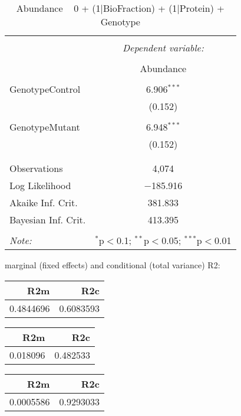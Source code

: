 \documentclass[11pt]{report}
\begin{document}
\begin{table}[!htbp] \centering 
  \caption{Abundance ~ 0 + (1|BioFraction) + (1|Protein) + Genotype} 
  \label{} 
\begin{tabular}{@{\extracolsep{5pt}}lc} 
\\[-1.8ex]\hline 
\hline \\[-1.8ex] 
 & \multicolumn{1}{c}{\textit{Dependent variable:}} \\ 
\cline{2-2} 
\\[-1.8ex] & Abundance \\ 
\hline \\[-1.8ex] 
 GenotypeControl & 6.906$^{***}$ \\ 
  & (0.152) \\ 
  & \\ 
 GenotypeMutant & 6.948$^{***}$ \\ 
  & (0.152) \\ 
  & \\ 
\hline \\[-1.8ex] 
Observations & 4,074 \\ 
Log Likelihood & $-$185.916 \\ 
Akaike Inf. Crit. & 381.833 \\ 
Bayesian Inf. Crit. & 413.395 \\ 
\hline 
\hline \\[-1.8ex] 
\textit{Note:}  & \multicolumn{1}{r}{$^{*}$p$<$0.1; $^{**}$p$<$0.05; $^{***}$p$<$0.01} \\ 
\end{tabular} 
\end{table} 
marginal (fixed effects) and conditional (total variance) R2:

\begin{tabular}{r|r}
\hline
R2m & R2c\\
\hline
0.4844696 & 0.6083593\\
\hline
\end{tabular}

\begin{tabular}{r|r}
\hline
R2m & R2c\\
\hline
0.018096 & 0.482533\\
\hline
\end{tabular}

\begin{tabular}{r|r}
\hline
R2m & R2c\\
\hline
0.0005586 & 0.9293033\\
\hline
\end{tabular}
\end{document}

